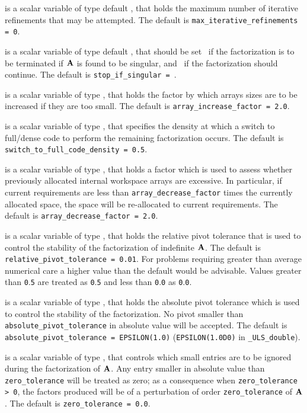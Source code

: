 \documentclass{galahad}
\newcommand{\packagename}{ULS}
\newcommand{\fullpackagename}{\libraryname\_\-\packagename}
\begin{document}
\begin{description}
 is a scalar variable of type default 
\integer, that holds 
the maximum number of iterative refinements that may be attempted.
The default is {\tt max\_iterative\_refinements = 0}.

 is a scalar variable of type default 
\logical, that should be set \true\ if the factorization is
to be terminated if ${\mathbf{A}}$ is found to be singular, and
\false\ if the factorization should continue.
The default is {\tt stop\_if\_singular = \false}.

 is a scalar variable of type \realdp, that holds
the factor by which arrays sizes are to be increased if they are too small.
The default is {\tt array\_increase\_factor = 2.0}.

 is a scalar variable of type \realdp, 
that specifies the density at which a switch to full/dense code 
to perform the remaining factorization occurs.
The default is {\tt switch\_to\_full\_code\_density = 0.5}.

 is a scalar variable of type \realdp, that holds
a factor which is used to assess whether previously allocated internal 
workspace arrays are excessive. In particular, if current requirements are
less than {\tt array\_decrease\_factor} times the currently allocated space,
the space will be re-allocated to current requirements.
The default is {\tt array\_decrease\_factor = 2.0}.

 is a scalar variable of type \realdp,
that holds the relative pivot tolerance that is used to control the
stability of the factorization of indefinite ${\mathbf{A}}$.
The default is {\tt relative\_pivot\_tolerance = 0.01}.
For problems requiring greater 
than average numerical care a higher value than the default would be 
advisable. Values greater than {\tt 0}.{\tt 5} are treated as {\tt 0}.{\tt 5}
and less than {\tt 0}.{\tt 0} as {\tt 0}.{\tt 0}. 

 is a scalar variable of type \realdp, that 
holds the absolute pivot tolerance which is used to control the
stability of the factorization.
No pivot smaller than {\tt absolute\_pivot\_tolerance} in
absolute value will be accepted.
The default is {\tt absolute\_pivot\_\-tolerance = EPSILON(1.0)}
({\tt EPSILON(1.0D0)} in {\tt \fullpackagename\_double}).

 is a scalar variable of type \realdp, that 
controls which small entries are to be ignored during the factorization
of ${\mathbf{A}}$. Any entry smaller in absolute value than 
{\tt zero\_\-tolerance} will be treated as zero; as a consequence when
{\tt zero\_tolerance > 0}, the factors produced will be of a perturbation
of order {\tt zero\_tolerance} of ${\mathbf{A}}$.
The default is {\tt zero\_tolerance = 0.0}.


\end{description}
\end{document}
